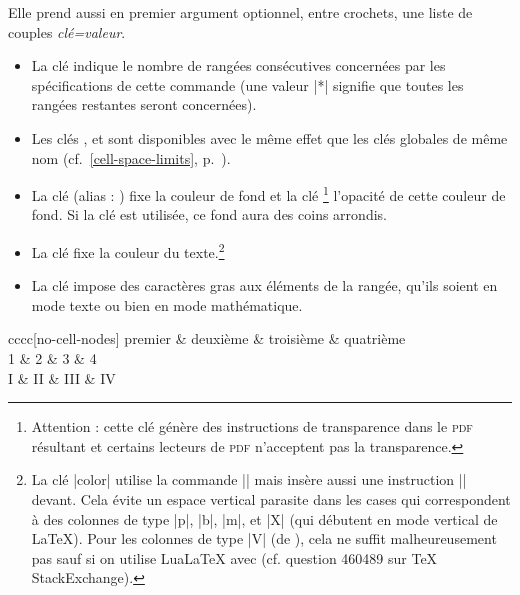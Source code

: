 \documentclass[dvipsnames]{article}
\begin{document}
\medskip
Elle prend aussi en premier argument optionnel, entre crochets, une liste de
couples \textsl{clé=valeur}.
\begin{itemize}[beginpenalty=10000]
\item {}
La clé  indique le nombre de rangées consécutives concernées par
les spécifications de cette commande (une valeur |*| signifie que toutes les
rangées restantes seront concernées).
\item Les clés ,
 et 
sont disponibles avec le même effet que les clés globales de même nom
(cf.~\ref{cell-space-limits}, p.~\pageref{cell-space-limits}).

\item 
{}
La clé  (alias : ) fixe la couleur de fond
et la clé \footnote{Attention : cette clé génère des
  instructions de transparence dans le \textsc{pdf} résultant et certains
  lecteurs de \textsc{pdf} n'acceptent pas la transparence.} l'opacité de cette
couleur de fond. Si la clé  est utilisée, ce fond
aura des coins arrondis.

\item 
{} 
La clé  fixe la couleur du texte.\footnote{La clé |color|
  utilise la commande |\color| mais insère aussi une instruction |\leavevmode|
  devant. Cela évite un espace vertical parasite dans les cases qui
  correspondent à des colonnes de type |p|, |b|, |m|, et |X| (qui débutent en
  mode vertical de LaTeX). Pour les colonnes de type |V| (de ),
  cela ne suffit malheureusement pas sauf si on utilise LuaLaTeX avec
   (cf. question 460489 sur TeX StackExchange).}

\item {}
La clé  impose des caractères gras aux éléments de la rangée, qu'ils
soient en mode texte ou bien en mode mathématique.
\end{itemize}

\medskip
{}
\begin{Code}[width=12cm,show-output]
\begin{NiceTabular}{cccc}[no-cell-nodes]
\hline
  \emph{\RowStyle[cell-space-limits=3pt]{\rotate}}
  premier & deuxième & troisième & quatrième \\
  \emph{\RowStyle[nb-rows=2,color=white,fill=blue!50]{\sffamily}}
  1 & 2 & 3 & 4 \\
  I & II & III & IV 
\end{NiceTabular}
\end{Code}
\end{document}
